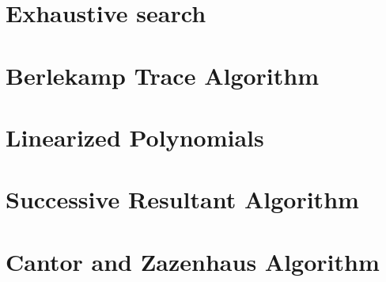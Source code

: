 \section{Exhaustive search}
\section{Berlekamp Trace Algorithm}
\section{Linearized Polynomials}
\section{Successive Resultant Algorithm}
\section{Cantor and Zazenhaus Algorithm}
